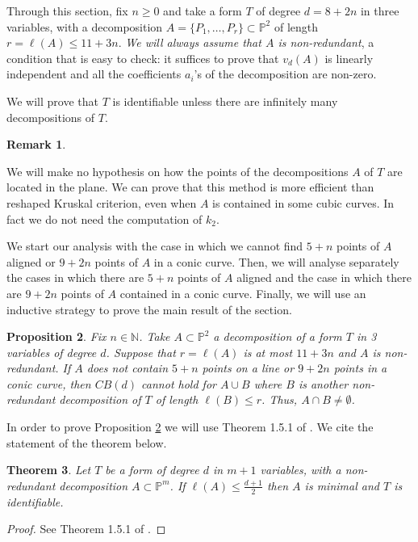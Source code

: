 \documentclass[a4paper,10pt,oneside]{article}
\theoremstyle{casep}
\newcommand{\Pj}{\mathbb{P}}
\newcommand{\N}{\mathbb{N}}
\newtheorem{theorem}{Theorem}[section]
\newtheorem{proposition}[theorem]{Proposition}
\theoremstyle{definition}
\newtheorem{remark}[theorem]{Remark}
\begin{document}
 Through this section, fix $n\geq 0$ and take a form $T$ of degree $d=8+2n$ in three variables, with a decomposition 
 $A=\{P_1,\dots,P_r\}\subset\Pj^2$ of length $r=\ell(A)\leq 11+3n$. \emph{We will always assume that $A$ is non-redundant}, 
 a condition that is easy to check: it suffices to prove that $v_d(A)$ is linearly independent and all the coefficients $a_i$'s of the decomposition are non-zero.
 
 We will prove that $T$ is identifiable unless there are infinitely many decompositions of $T$. 

\begin{remark}
\label{shh}

We will make no hypothesis on how the points of the decompositions $ A $ of $ T $ are located in the plane. We can prove that this method is more efficient than reshaped Kruskal criterion, even when $ A $ is contained in some cubic curves. In fact we do not need the computation of $ k_2 $. 
\end{remark}


We start our analysis with the case in which we cannot find $ 5 +n $ points of $ A $ aligned or $ 9+2n $ points of $ A $ in a conic curve. Then, we will analyse separately the cases in which there are $ 5+n $ points of $ A $ aligned and the case in which there are $ 9+2n $ points of $ A $ contained in a conic curve. Finally, we will use an inductive strategy to prove the main result of the section.


\begin{proposition} Fix $ n \in \N $. Take $ A \subset \Pj^2 $ a decomposition of a form $ T $ in 3 variables of degree $ d $. Suppose that $ r=\ell(A) $ is at most $ 11+3n $ and $ A $ is non-redundant. If $A$ does not contain $ 5+n $ points on a line or $ 9+2n $ points in a conic curve, then $ CB(d) $ cannot hold for $ A\cup B $ where $ B $ is another non-redundant decomposition of $ T $ of length $ \ell(B) \leq r $. Thus, $A\cap B\neq \emptyset$.
\label{claim:2}
\end{proposition}

In order to prove Proposition \ref{claim:2} we will use Theorem 1.5.1 of \cite{undici}. We cite the statement of the theorem below.

\begin{theorem}
	Let $T$ be a form of degree $d$ in $ m +1$ variables, with a non-redundant decomposition $A \subset \Pj^{m}$. If $\ell(A)\leq \frac{d+1}{2}$ then $A$ is minimal
	and $T$ is identifiable.
	\label{theorem:1}
\end{theorem}
\begin{proof} See Theorem 1.5.1 of \cite{undici}.
	
	
\end{proof}
\end{document}
